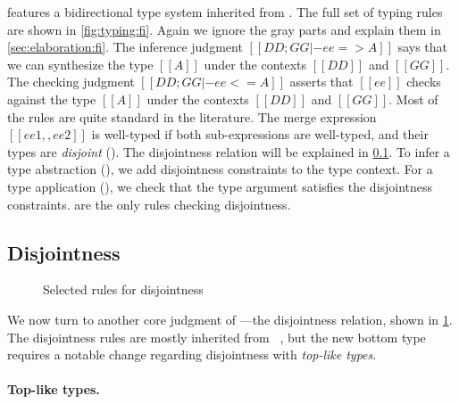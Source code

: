 \fnamee features a bidirectional type system inherited from \fname.
The full set of typing rules are shown in \cref{fig:typing:fi}. Again we ignore
the gray parts and explain them in \cref{sec:elaboration:fi}.
The inference judgment $[[ DD; GG |- ee => A ]]$ says
that we can synthesize the type $[[A]]$ under the contexts $[[DD]]$ and
$[[GG]]$. The checking judgment $[[ DD ; GG |- ee <= A ]]$ asserts that $[[ee]]$
checks against the type $[[A]]$ under the contexts $[[DD]]$ and $[[GG]]$.
Most of the rules are quite standard in the literature.
The merge expression $[[ee1 ,, ee2]]$ is well-typed if both sub-expressions are
well-typed, and their types are \textit{disjoint} ().
The disjointness relation will be explained in \cref{sec:disjoint:fi}.
To infer a type abstraction (), we add disjointness constraints to the type
context. For a type
application (), we check that the type argument
satisfies the disjointness constraints.
 are the only rules checking disjointness.


\subsection{Disjointness}
\label{sec:disjoint:fi}

\renewcommand{\rulehl}[1]{#1}

\begin{figure}[t]
  \centering
  \caption{Selected rules for disjointness}
  \label{fig:disjoint:fi}
\end{figure}

We now turn to another core judgment of \fnamee---the disjointness relation,
shown in \cref{fig:disjoint:fi}. The disjointness rules are mostly inherited
from \fname~\cite{alpuimdisjoint}, but the new bottom type requires
a notable change regarding disjointness with \emph{top-like types}.

\paragraph{Top-like types.}

